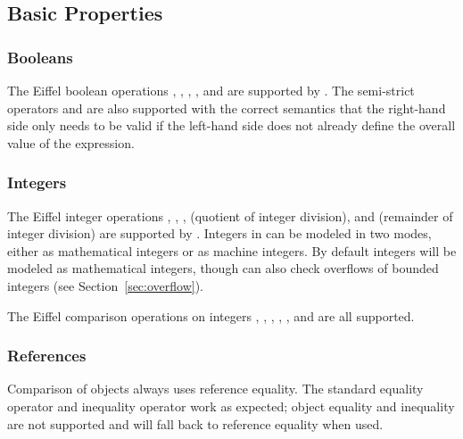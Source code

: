 \subsection{Basic Properties}

\subsubsection*{Booleans}

The Eiffel boolean operations , , , , and  are supported by \AutoProof. The semi-strict operators  and  are also supported with the correct semantics that the right-hand side only needs to be valid if the left-hand side does not already define the overall value of the expression.

\subsubsection*{Integers}

The Eiffel integer operations \e{+}, \e{-}, \e{*}, \e{//} (quotient of integer division), and \e{\\\\} (remainder of integer division) are supported by \AutoProof. Integers in \AutoProof can be modeled in two modes, either as mathematical integers or as machine integers. By default integers will be modeled as mathematical integers, though \AutoProof can also check overflows of bounded integers (see Section~\ref{sec:overflow}).

The Eiffel comparison operations on integers \e{=}, \e{/=}, \e{<}, \e{>}, \e{<=}, and \e{>=} are all supported.

\subsubsection*{References}

Comparison of objects always uses reference equality. The standard equality operator  and inequality operator  work as expected; object equality  and inequality  are not supported and will fall back to reference equality when used.

